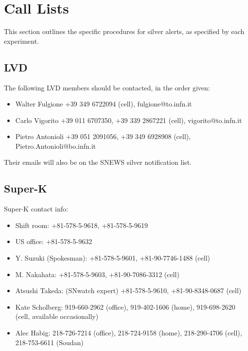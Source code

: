 \documentclass{article}
\begin{document}
\section{Call Lists}      

This section outlines the specific procedures for silver alerts, as
specified by each experiment.

\subsection{LVD}

The following LVD members should be contacted, in the order given:

\begin{itemize}
\item Walter Fulgione +39 349 6722094 (cell), fulgione@to.infn.it

\item Carlo Vigorito +39 011 6707350, +39 339 2867221 (cell), vigorito@to.infn.it

\item Pietro Antonioli +39 051 2091056, +39 349 6928908 (cell), Pietro.Antonioli@bo.infn.it
\end{itemize}

Their emails will also be on the SNEWS silver notification list.

\subsection{Super-K}

Super-K contact info:

\begin{itemize}
\item Shift room: +81-578-5-9618, +81-578-5-9619

\item US office: +81-578-5-9632

\item Y. Suzuki (Spokesman): +81-578-5-9601, +81-90-7746-1488 (cell)

\item M. Nakahata: +81-578-5-9603, +81-90-7086-3312 (cell)

\item Atsushi Takeda: (SNwatch expert) +81-578-5-9610, +81-90-8348-0687 (cell)

\item Kate Scholberg: 919-660-2962 (office), 919-402-1606 (home), 919-698-2620 (cell, available occasionally)

\item Alec Habig: 218-726-7214 (office), 218-724-9158 (home), 218-290-4706 (cell), 218-753-6611 (Soudan)

\end{itemize}
\end{document}
